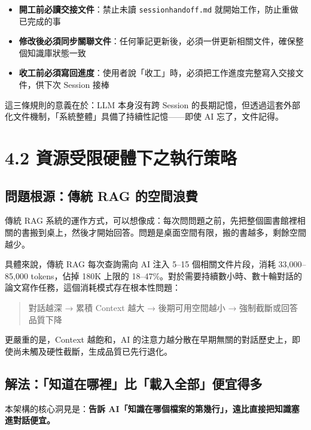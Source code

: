 \begin{itemize}
\tightlist
\item
  \textbf{開工前必讀交接文件}：禁止未讀 \texttt{sessionhandoff.md}
  就開始工作，防止重做已完成的事
\item
  \textbf{修改後必須同步關聯文件}：任何筆記更新後，必須一併更新相關文件，確保整個知識庫狀態一致
\item
  \textbf{收工前必須寫回進度}：使用者說「收工」時，必須把工作進度完整寫入交接文件，供下次
  Session 接棒
\end{itemize}

這三條規則的意義在於：LLM 本身沒有跨 Session
的長期記憶，但透過這套外部化文件機制，「系統整體」具備了持續性記憶------即使
AI 忘了，文件記得。

\section{4.2
資源受限硬體下之執行策略}\label{ux8cc7ux6e90ux53d7ux9650ux786cux9ad4ux4e0bux4e4bux57f7ux884cux7b56ux7565}

\subsection{問題根源：傳統 RAG
的空間浪費}\label{ux554fux984cux6839ux6e90ux50b3ux7d71-rag-ux7684ux7a7aux9593ux6d6aux8cbb}

傳統 RAG
系統的運作方式，可以想像成：每次問問題之前，先把整個圖書館裡相關的書搬到桌上，然後才開始回答。問題是桌面空間有限，搬的書越多，剩餘空間越少。

具體來說，傳統 RAG 每次查詢需向 AI 注入 5--15 個相關文件片段，消耗
33,000--85,000 tokens，佔掉 180K 上限的
18--47\%。對於需要持續數小時、數十輪對話的論文寫作任務，這個消耗模式存在根本性問題：

\begin{quote}
對話越深 → 累積 Context 越大 → 後期可用空間越小 → 強制截斷或回答品質下降
\end{quote}

更嚴重的是，Context 越飽和，AI
的注意力越分散在早期無關的對話歷史上，即使尚未觸及硬性截斷，生成品質已先行退化。

\subsection{解法：「知道在哪裡」比「載入全部」便宜得多}\label{ux89e3ux6cd5ux77e5ux9053ux5728ux54eaux88e1ux6bd4ux8f09ux5165ux5168ux90e8ux4fbfux5b9cux5f97ux591a}

本架構的核心洞見是：\textbf{告訴
AI「知識在哪個檔案的第幾行」，遠比直接把知識塞進對話便宜。}

